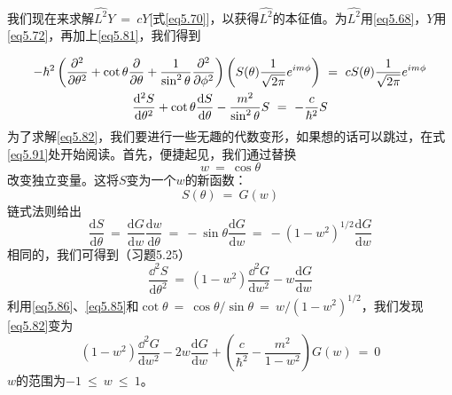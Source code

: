 \documentclass[12pt,a4paper,openany]{ctexbook}
\newcommand{\dd}[1]{\mathrm{d} #1}
\newcommand{\paren}[1]{\left( #1 \right)}
\begin{document}
\begin{flushleft}
我们现在来求解$\hat{L^2}Y\ =\ cY$[式\eqref{eq5.70}]，以获得$\hat{L^2}$的本征值。为$\hat{L^2}$用\eqref{eq5.68}，$Y$用\eqref{eq5.72}，再加上\eqref{eq5.81}，我们得到

{\centering  %
  \small  %
  \begin{list}{}{%
    \setlength{\leftmargin}{0pt}  %
    \setlength{\rightmargin}{0pt}
    \setlength{\textwidth}{0.6\textwidth}  %
  }
    \item   \begin{gather}
        -\hbar^2\paren{\frac{\partial^2}{\partial\theta^2}+\cot\theta\frac{\partial}{\partial\theta}+\frac{1}{\sin^2\theta}\frac{\partial^2}{\partial\phi^2}}\paren{S(\theta)\frac{1}{\sqrt{2\pi}}e^{im\phi}}\ =\ cS(\theta)\frac{1}{\sqrt{2\pi}}e^{im\phi} \notag \\
        \frac{\dd^2S}{\dd\theta^2}+\cot\theta\frac{\dd S}{\dd\theta}-\frac{m^2}{\sin^2\theta}S\ =\ -\frac{c}{\hbar^2}S \label{eq5.82}
    \end{gather}
    为了求解\eqref{eq5.82}，我们要进行一些无趣的代数变形，如果想的话可以跳过，在式\eqref{eq5.91}处开始阅读。首先，便捷起见，我们通过替换
    \begin{equation}
        w\ =\ \cos\theta \label{eq5.83}
    \end{equation}
    改变独立变量。这将$S$变为一个$w$的新函数：
    \begin{equation}
        S(\theta)\ =\ G(w) \label{eq5.84}
    \end{equation}
    链式法则给出
    \begin{equation}
        \frac{\dd S}{\dd \theta}\ =\ \frac{\dd G}{\dd w}\frac{\dd w}{\dd\theta}\ =\ -\sin\theta\frac{\dd G}{\dd w}\ =\ -(1-w^2)^{1/2}\frac{\dd G}{\dd w} \label{eq5.85}
    \end{equation}
    相同的，我们可得到（习题5.25）
    \begin{equation}
        \frac{\dd^2S}{\dd\theta^2}\ =\ (1-w^2)\frac{\dd^2G}{\dd w^2}-w\frac{\dd G}{\dd w} \label{eq5.86}
    \end{equation}
    利用\eqref{eq5.86}、\eqref{eq5.85}和$\cot\theta\ =\ \cos\theta/\sin\theta\ =\ w/(1-w^2)^{1/2}$，我们发现\eqref{eq5.82}变为
    \begin{equation}
        (1-w^2)\frac{\dd^2G}{\dd w^2}-2w\frac{\dd G}{\dd w}+\paren{\frac{c}{\hbar^2}-\frac{m^2}{1-w^2}}G(w)\ =\ 0 \label{eq5.87}
    \end{equation}
    $w$的范围为$-1\ \leq\ w\ \leq\ 1$。


\end{list}}
\end{flushleft}
\end{document}
